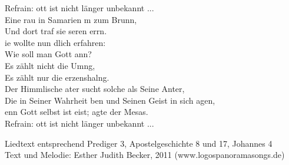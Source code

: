 Refrain:	ott ist nicht länger unbekannt ...\\

Eine rau in Samarien m zum Brunn,\\
Und dort traf sie seren errn.\\
ie wollte nun dlich erfahren:\\
Wie soll man Gott ann?\\
Es zählt nicht die Umng,\\
Es zählt nur die erzenshalng.\\
Der Himmlische ater sucht solche als Seine Anter,\\
Die in Seiner Wahrheit ben und Seinen Geist in sich agen,\\
enn Gott selbst ist eist; agte der Mesas.\\

Refrain:	ott ist nicht länger unbekannt ...\\

\begin{footnotesize}
Liedtext entsprechend Prediger 3, Apostelgeschichte 8 und 17, Johannes 4\\
Text und Melodie: Esther Judith Becker, 2011 (www.logospanoramasongs.de)
\end{footnotesize}